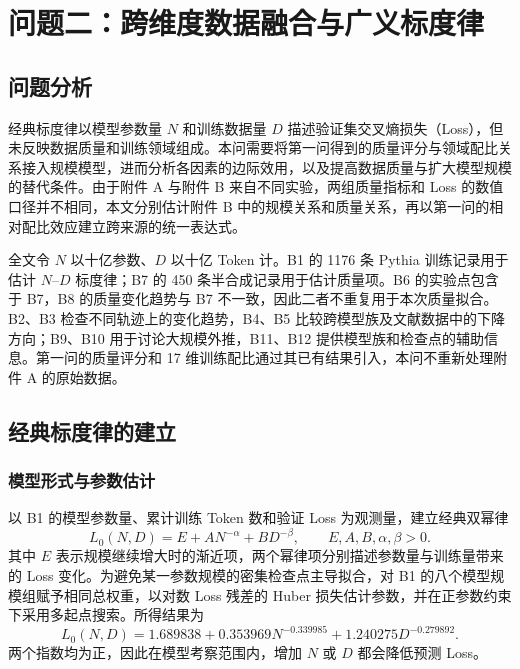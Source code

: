 \setcounter{section}{4}
\section{问题二：跨维度数据融合与广义标度律}
\label{sec:q2}
\setcounter{equation}{0}
\setcounter{figure}{0}
\setcounter{table}{0}

\subsection{问题分析}

经典标度律以模型参数量 $N$ 和训练数据量 $D$ 描述验证集交叉熵损失（Loss）\cite{kaplan2020scaling,hoffmann2022training}，但未反映数据质量和训练领域组成。本问需要将第一问得到的质量评分与领域配比关系接入规模模型，进而分析各因素的边际效用，以及提高数据质量与扩大模型规模的替代条件。由于附件 A 与附件 B 来自不同实验，两组质量指标和 Loss 的数值口径并不相同，本文分别估计附件 B 中的规模关系和质量关系，再以第一问的相对配比效应建立跨来源的统一表达式。

全文令 $N$ 以十亿参数、$D$ 以十亿 Token 计。B1 的 1176 条 Pythia\cite{pythia2023} 训练记录用于估计 $N$--$D$ 标度律；B7 的 450 条半合成记录用于估计质量项。B6 的实验点包含于 B7，B8 的质量变化趋势与 B7 不一致，因此二者不重复用于本次质量拟合。B2、B3 检查不同轨迹上的变化趋势，B4、B5 比较跨模型族及文献数据中的下降方向；B9、B10 用于讨论大规模外推，B11、B12 提供模型族和检查点的辅助信息。第一问的质量评分和 17 维训练配比通过其已有结果引入，本问不重新处理附件 A 的原始数据。

\subsection{经典标度律的建立}

\subsubsection{模型形式与参数估计}

以 B1 的模型参数量、累计训练 Token 数和验证 Loss 为观测量，建立经典双幂律\cite{hoffmann2022training}
\begin{equation}
 L_0(N,D)=E+A N^{-\alpha}+B D^{-\beta},
 \qquad E,A,B,\alpha,\beta>0.
 \label{eq:q2-classic}
\end{equation}
其中 $E$ 表示规模继续增大时的渐近项，两个幂律项分别描述参数量与训练量带来的 Loss 变化。为避免某一参数规模的密集检查点主导拟合，对 B1 的八个模型规模组赋予相同总权重，以对数 Loss 残差的 Huber 损失\cite{huber2020}估计参数，并在正参数约束下采用多起点搜索。所得结果为
\begin{equation}
 L_0(N,D)=1.689838+0.353969N^{-0.339985}
              +1.240275D^{-0.279892}.
 \label{eq:q2-classic-fit}
\end{equation}
两个指数均为正，因此在模型考察范围内，增加 $N$ 或 $D$ 都会降低预测 Loss。

